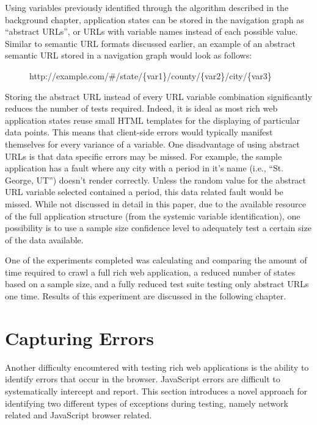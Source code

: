 Using variables previously identified through the algorithm described in the background chapter, application states can be stored in the navigation graph as ``abstract URLs''\cite{wang09}, or URLs with variable names instead of each possible value.  Similar to semantic URL formats discussed earlier, an example of an abstract semantic URL stored in a navigation graph would look as follows:

\begin{figure}[H]
\centering
http://example.com/\#/state/\{var1\}/county/\{var2\}/city/\{var3\}
\end{figure}

Storing the abstract URL instead of every URL variable combination significantly reduces the number of tests required.  Indeed, it is ideal as most rich web application states reuse small HTML templates for the displaying of particular data points.  This means that client-side errors would typically manifest themselves for every variance of a variable.  One disadvantage of using abstract URLs is that data specific errors may be missed.  For example, the sample application has a fault where any city with a period in it's name (i.e., ``St. George, UT'') doesn't render correctly.  Unless the random value for the abstract URL variable selected contained a period, this data related fault would be missed.  While not discussed in detail in this paper, due to the available resource of the full application structure (from the systemic variable identification), one possibility is to use a sample size confidence level to adequately test a certain size of the data available.

One of the experiments completed was calculating and comparing the amount of time required to crawl a full rich web application, a reduced number of states based on a sample size, and a fully reduced test suite testing only abstract URLs one time.  Results of this experiment are discussed in the following chapter.

\section{Capturing Errors}
Another difficulty encountered with testing rich web applications is the ability to identify errors that occur in the browser.  JavaScript errors are difficult to systematically intercept and report.  This section introduces a novel approach for identifying two different types of exceptions during testing, namely network related and JavaScript browser related.

